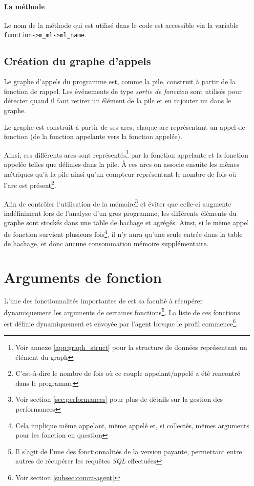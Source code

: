 \paragraph*{La méthode} Le nom de la méthode qui est utilisé dans le code \Python est accessible via la variable \verb|function->m_ml->ml_name|.
  \clearpage
\subsection{Création du graphe d'appels}
\label{subsec:crea-graph-appel}
Le \gls{graphe d'appels} du programme est, comme la pile, construit à partir de la fonction de rappel. Les événements de type \emph{sortie de fonction} sont utilisés pour détecter quand il faut retirer un élément de la pile et en rajouter un dans le graphe.

Le graphe est construit à partir de ses arcs, chaque arc représentant un appel de fonction (de la fonction appelante vers la fonction appelée).

Ainsi, ces différents arcs sont représentés\footnote{Voir annexe \vref{app:graph_struct} pour la structure de données représentant un élément du graph} par la fonction appelante et la fonction appelée telles que définies dans la pile. À ces arcs on associe ensuite les mêmes métriques qu'à la pile ainsi qu'un compteur représentant le nombre de fois où l'arc est présent\footnote{C'est-à-dire le nombre de fois où ce couple appelant/appelé a été rencontré dans le programme}.

\begin{note}
Afin de contrôler l'utilisation de la mémoire\footnote{Voir section \vref{sec:performances} pour plus de détails sur la gestion des performances} et éviter que celle-ci augmente indéfiniment lors de l'analyse d'un gros programme, les différents éléments du graphe sont stockés dans une table de hachage et agrégés. Ainsi, si le même appel de fonction survient plusieurs fois\footnote{Cela implique même appelant, même appelé et, si collectés, mêmes arguments pour les fonction en question}, il n'y aura qu'une seule entrée dans la table de hachage, et donc aucune consommation mémoire supplémentaire.
\end{note}
\clearpage
  \section{Arguments de fonction}
  \label{sec:fnargs}
L'une des fonctionnalités importantes de \Blackfire est sa faculté à récupérer dynamiquement les arguments de certaines fonctions\footnote{Il s'agit de l'une des fonctionnalités de la version payante, permettant entre autres de récupérer les requêtes \emph{SQL} effectuées}. La liste de ces fonctions est définie dynamiquement et envoyée par l'agent lorsque le profil commence\footnote{Voir section \vref{subsec:comm-agent}}.

